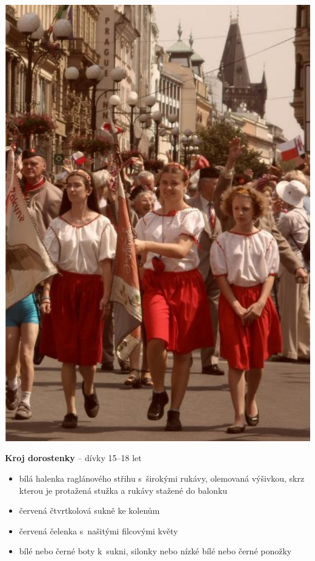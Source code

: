 \documentclass[11pt]{article}
\begin{document}
\vspace*{24pt}

\begin{minipage}{0.3\linewidth}   
  \includegraphics[width=0.98\linewidth]{kroj_dorostenka.png} 
\end{minipage}
\begin{minipage}{0.6\linewidth}
  \center
  \textbf{Kroj dorostenky} – dívky 15–18 let

  \begin{itemize}[itemsep=-3pt,leftmargin=2em]
    \item bílá halenka raglánového střihu s~širokými rukávy, olemovaná výšivkou, skrz kterou je protažená stužka a rukávy stažené \luv{}do balonku\ruv{}
    \item červená čtvrtkolová sukně ke kolenům
    \item červená čelenka s~našitými filcovými květy
    \item bílé nebo černé \luv{}boty k~sukni\ruv{}, silonky nebo nízké bílé nebo černé ponožky
  \end{itemize}
\end{minipage}
\end{document}
